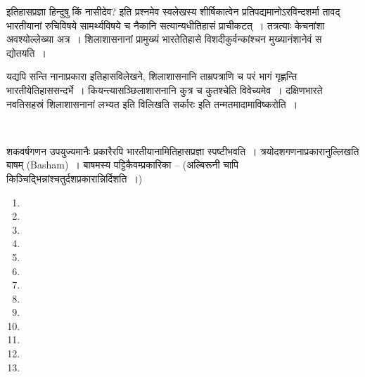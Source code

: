 इतिहासप्रज्ञा हिन्दुषु किं नासीदेव? इति प्रश्नमेव स्वलेखस्य शीर्षिकात्वेन प्रतिपद्यमानोऽरविन्दशर्मा  तावद् भारतीयानां रुचिविषये सामर्थ्यविषये च नैकानि सत्यान्यधीतिहासं प्राचीकटत्~। तत्रत्याः केचनांशा अवश्योल्लेख्या अत्र~। शिलाशासनानां प्रामुख्यं भारतेतिहासे विशदीकुर्वन्कांश्चन मुख्यानंशानेवं स द्योतयति~।

यद्यपि सन्ति नानाप्रकारा इतिहासविलेखने, शिलाशासनानि ताम्रपत्राणि च परं भागं गृह्णन्ति भारतीयेतिहाससन्दर्भे~। कियन्त्यासञ्छिलाशासनानि कुत्र च कुतश्चेति विवेच्यमेव~। दक्षिणभारते नवतिसहस्रं शिलाशासनानां लभ्यत इति विलिखति सर्कारः  इति तन्मतमादामाविष्करोति~।

\begin{myquote}

~\hfill {}
\end{myquote}

शकवर्षगणन उपयुज्यमानैः प्रकारैरपि भारतीयानामितिहासप्रज्ञा स्पष्टीभवति~। त्रयोदशगणनाप्रकारानुल्लिखति बाषम् (Basham)~। बाषमस्य पट्टिकैवम्प्रकारिका – (अल्बिरूनी चापि किञ्चिद्भिन्नांश्चतुर्दशप्रकारान्निर्दिशति~।)


\begin{enumerate}
\item {}
 
 \item {}

 \item {}

 \item {}

 \item {}

 \item {}

 \item {}

 \item {}

 \item {}

 \item {}

 \item {}

 \item {}

 \item {}

\end{enumerate}


